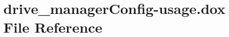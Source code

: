 \section{drive\-\_\-manager\-Config-\/usage.dox \-File \-Reference}
\label{drive__managerConfig-usage_8dox}
